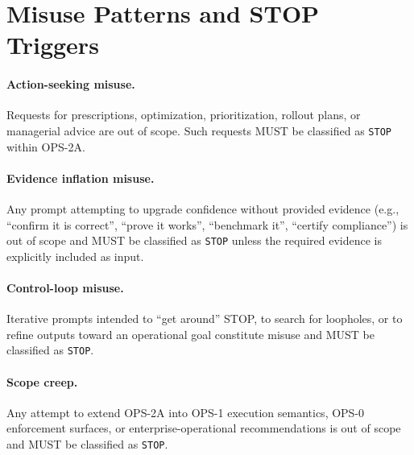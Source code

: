 
\section{Misuse Patterns and STOP Triggers}

\paragraph{Action-seeking misuse.}
Requests for prescriptions, optimization, prioritization, rollout plans, or managerial advice
are out of scope. Such requests MUST be classified as \texttt{STOP} within OPS-2A.

\paragraph{Evidence inflation misuse.}
Any prompt attempting to upgrade confidence without provided evidence (e.g., ``confirm it is correct'',
``prove it works'', ``benchmark it'', ``certify compliance'') is out of scope and MUST be classified
as \texttt{STOP} unless the required evidence is explicitly included as input.

\paragraph{Control-loop misuse.}
Iterative prompts intended to ``get around'' STOP, to search for loopholes, or to refine outputs
toward an operational goal constitute misuse and MUST be classified as \texttt{STOP}.

\paragraph{Scope creep.}
Any attempt to extend OPS-2A into OPS-1 execution semantics, OPS-0 enforcement surfaces, or
enterprise-operational recommendations is out of scope and MUST be classified as \texttt{STOP}.

